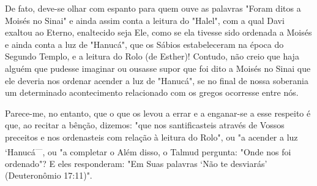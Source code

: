 \begin{itemize}
\begin{enumrate}
De fato, deve-se olhar com espanto para quem ouve as palavras "Fo­ram
ditos a Moisés no Sinai" e ainda assim conta a leitura do "Halel", com a
qual Davi exaltou ao Eterno, enaltecido seja Ele, como se ela tivesse
sido orde­nada a Moisés e ainda conta a luz de "Hanucá", que os Sábios
estabeleceram na época do Segundo Templo, e a leitura do Rolo (de
Esther)! Contudo, não creio que haja alguém que pudesse imaginar ou
ousasse supor que foi dito a Moisés no Sinai que ele deveria nos ordenar
acender a luz de "Hanucá", se no final de nossa soberania um determinado
acontecimento relacionado com os gregos ocorresse entre nós.

Parece-me, no entanto, que o que os levou a errar e a enganar-se a esse
respeito é que, ao recitar a bênção, dizemos: "que nos santificasteis
atra­vés de Vossos preceitos e nos ordenasteis com relação à leitura do
Rolo", ou "a acender a luz `Hanucá\textsuperscript{---}, ou "a completar
o Além disso, o Talmud pergunta: "Onde nos foi ordenado"? E eles
responderam: "Em Suas palavras `Não te desviarás' (Deuteronômio 17:11)".


\end{enumrate}
\end{itemize}
